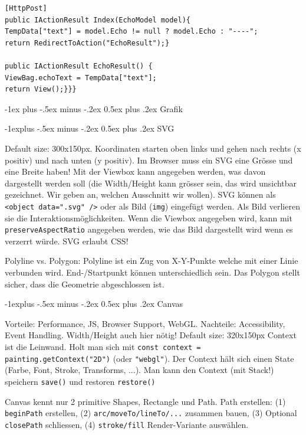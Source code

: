\documentclass[a4paper, fontsize=6pt]{scrartcl}
\makeatletter
\renewcommand{\section}{\@startsection{section}{1}{0mm}%
    {-1ex plus -.5ex minus -.2ex}%
    {0.5ex plus .2ex}%
    {\normalfont\large\bfseries}}
\renewcommand{\subsection}{\@startsection{subsection}{2}{0mm}%
    {-1explus -.5ex minus -.2ex}%
    {0.5ex plus .2ex}%
    {\normalfont\normalsize\bfseries}}
\newcommand{\html}[1]{\texttt{#1}}
\newcommand{\js}[1]{\texttt{#1}}
\makeatother
\begin{document}
\begin{multicols*}{5}
\begin{verbatim}
[HttpPost]
public IActionResult Index(EchoModel model){
TempData["text"] = model.Echo != null ? model.Echo : "----";
return RedirectToAction("EchoResult");}

public IActionResult EchoResult() {
ViewBag.echoText = TempData["text"];
return View();}}}
\end{verbatim}

\section{Grafik}

\subsection{SVG}

Default size: 300x150px. Koordinaten starten oben links und gehen nach rechts (x positiv) und nach unten (y positiv). Im Browser muss ein SVG eine Grösse und eine Breite haben! Mit der Viewbox kann angegeben werden, was davon dargestellt werden soll (die Width/Height kann grösser sein, das wird unsichtbar gezeichnet. Wir geben an, welchen Ausschnitt wir wollen). SVG können als \html{<object data=".svg" />} oder als Bild (\html{img}) eingefügt werden. Als Bild verlieren sie die Interaktionsmöglichkeiten. Wenn die Viewbox angegeben wird, kann mit \html{preserveAspectRatio} angegeben werden, wie das Bild dargestellt wird wenn es verzerrt würde. SVG erlaubt CSS!

Polyline vs. Polygon: Polyline ist ein Zug von X-Y-Punkte welche mit einer Linie verbunden wird. End-/Startpunkt können unterschiedlich sein. Das Polygon stellt sicher, dass die Geometrie abgeschlossen ist.

\subsection{Canvas}

Vorteile: Performance, JS, Browser Support, WebGL. Nachteile: Accessibility, Event Handling. Width/Height auch hier nötig!
Default size: 320x150px
Context ist die Leinwand. Holt man sich mit \js{const context = painting.getContext("2D")} (oder \js{"webgl"}). Der Context hält sich einen State (Farbe, Font, Stroke, Transforms, ...). Man kann den Context (mit Stack!) speichern \js{save()} und restoren \js{restore()}

Canvas kennt nur 2 primitive Shapes, Rectangle und Path. Path erstellen: (1) \js{beginPath} erstellen, (2) \js{arc/moveTo/lineTo/...} zusammen bauen, (3) Optional \js{closePath} schliessen, (4) \js{stroke/fill} Render-Variante auswählen.


\end{multicols*}
\end{document}
